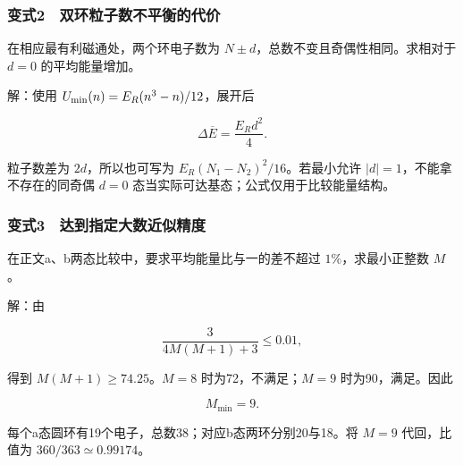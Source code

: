 \documentclass[12pt,a4paper,fontset=fandol]{ctexart}
\begin{document}
\subsubsection{变式2　双环粒子数不平衡的代价}\label{ux53d8ux5f0f2-ux53ccux73afux7c92ux5b50ux6570ux4e0dux5e73ux8861ux7684ux4ee3ux4ef7}

在相应最有利磁通处，两个环电子数为
\(N\pm d\)，总数不变且奇偶性相同。求相对于 \(d=0\) 的平均能量增加。

解：使用 \(U_{\rm min}(n)=E_R(n^3-n)/12\)，展开后

\[\boxed{\Delta\overline E=\frac{E_Rd^2}{4}.}\]

粒子数差为 \(2d\)，所以也可写为 \(E_R(N_1-N_2)^2/16\)。若最小允许
\(|d|=1\)，不能拿不存在的同奇偶 \(d=0\)
态当实际可达基态；公式仅用于比较能量结构。

\subsubsection{变式3　达到指定大数近似精度}\label{ux53d8ux5f0f3-ux8fbeux5230ux6307ux5b9aux5927ux6570ux8fd1ux4f3cux7cbeux5ea6}

在正文a、b两态比较中，要求平均能量比与一的差不超过 \(1\%\)，求最小正整数
\(M\)。

解：由

\[\frac3{4M(M+1)+3}\le0.01,\]

得到 \(M(M+1)\ge74.25\)。\(M=8\) 时为72，不满足；\(M=9\)
时为90，满足。因此

\[\boxed{M_{\min}=9.}\]

每个a态圆环有19个电子，总数38；对应b态两环分别20与18。将 \(M=9\)
代回，比值为 \(360/363\simeq0.99174\)。
\end{document}
